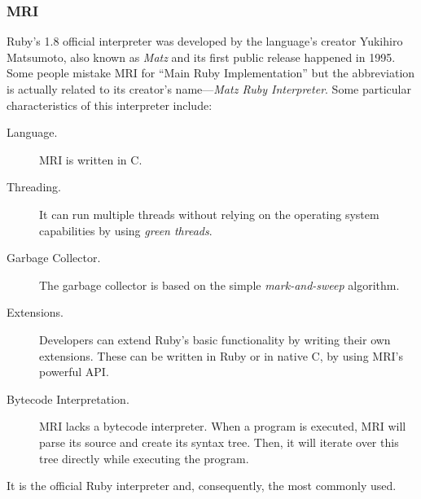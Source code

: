 \subsubsection{MRI}
Ruby's 1.8 official interpreter was developed by the language's creator Yukihiro Matsumoto, also known as \emph{Matz} and its first public release happened in 1995. Some people mistake MRI for ``Main Ruby Implementation'' but the abbreviation is actually related to its creator's name---\emph{Matz Ruby Interpreter}. Some particular characteristics of this interpreter include:
\begin{description}
\item[Language.] MRI is written in C.
\item[Threading.] It can run multiple threads without relying on the operating system capabilities by using \textit{green threads}.
\item[Garbage Collector.] The garbage collector is based on the simple \textit{mark-and-sweep} algorithm.
\item[Extensions.]  Developers can extend Ruby's basic functionality by writing their own extensions. These can be written in Ruby or in native C, by using MRI's powerful API.
\item[Bytecode Interpretation.] MRI lacks a bytecode interpreter. When a program is executed, MRI will parse its source and create its syntax tree. Then, it will iterate over this tree directly while executing the program.
\end{description}
It is the official Ruby interpreter and, consequently, the most commonly used. 



